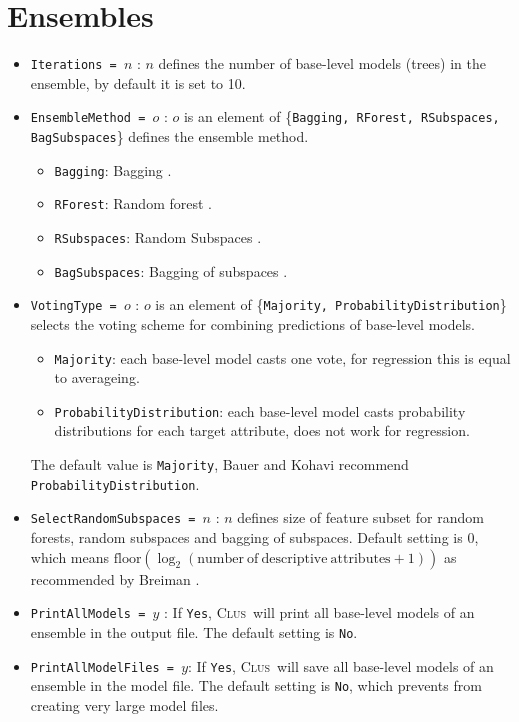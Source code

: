 \documentclass[a4paper]{report}
\newcommand{\clus}{\textsc{Clus}}
\begin{document}
\section{Ensembles}
\begin{itemize}
	\item \texttt{Iterations = $n$} : $n$ defines the number of base-level models (trees) in the ensemble, by default it is set to 10.
	\item \texttt{EnsembleMethod = $o$} : $o$ is an element of \{\texttt{Bagging, RForest, RSubspaces, BagSubspaces}\} defines the ensemble method.
	\begin{itemize}
		\item \texttt{Bagging}: Bagging \cite{Breiman1996}.
		\item \texttt{RForest}: Random forest \cite{Breiman2001}.
		\item \texttt{RSubspaces}: Random Subspaces \cite{Ho1998}.
		\item \texttt{BagSubspaces}: Bagging of subspaces \cite{PanovDzeroski2007}.
	\end{itemize}
	\item \texttt{VotingType = $o$} : $o$ is an element of \{\texttt{Majority, ProbabilityDistribution}\} selects the voting scheme for combining predictions of base-level models.
	\begin{itemize}
		\item \texttt{Majority}: each base-level model casts one vote, for regression this is equal to averageing.
		\item \texttt{ProbabilityDistribution}: each base-level model casts probability distributions for each target attribute, does not work for regression.
	\end{itemize}
	The default value is \texttt{Majority}, Bauer and Kohavi \cite{BauerKohavi1999} recommend \texttt{ProbabilityDistribution}.
	\item \texttt{SelectRandomSubspaces = $n$} : $n$ defines size of feature subset for random forests, random subspaces and bagging of subspaces. Default setting is 0, which means $\mathrm{floor}(\log_2(\mathrm{number\ of\ descriptive\ attributes} +1))$ as recommended by Breiman \cite{Breiman2001}.
	\item {\tt PrintAllModels = $y$} : If \texttt{Yes}, \clus\ will print all base-level models of an ensemble in the output file. The default setting is \texttt{No}.
	\item {\tt PrintAllModelFiles = $y$}: If \texttt{Yes}, \clus\ will save all base-level models of an ensemble in the model file. The default setting is \texttt{No}, which prevents from creating very large model files.

\end{itemize}
\end{document}
